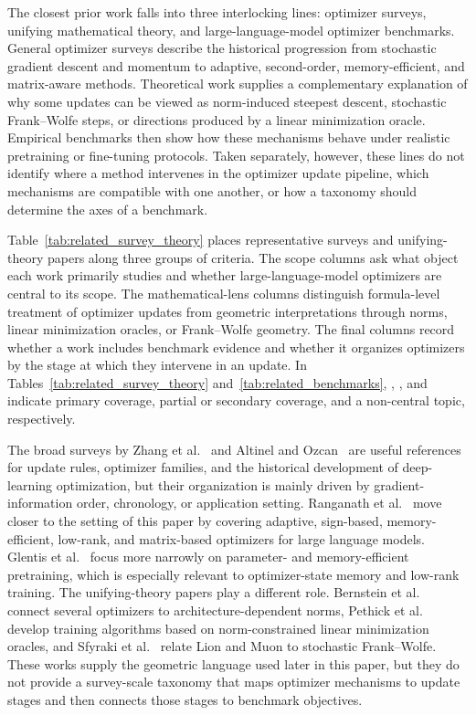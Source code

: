 The closest prior work falls into three interlocking lines: optimizer surveys,
unifying mathematical theory, and large-language-model optimizer benchmarks.
General optimizer surveys describe the historical progression from stochastic
gradient descent and momentum to adaptive, second-order, memory-efficient, and
matrix-aware methods.  Theoretical work supplies a complementary explanation of
why some updates can be viewed as norm-induced steepest descent, stochastic
Frank--Wolfe steps, or directions produced by a linear minimization oracle.
Empirical benchmarks then show how these mechanisms behave under realistic
pretraining or fine-tuning protocols.  Taken separately, however, these lines do
not identify where a method intervenes in the optimizer update pipeline, which
mechanisms are compatible with one another, or how a taxonomy should determine
the axes of a benchmark.

Table~\ref{tab:related_survey_theory} places representative surveys and
unifying-theory papers along three groups of criteria.  The scope columns ask
what object each work primarily studies and whether large-language-model
optimizers are central to its scope.  The mathematical-lens columns distinguish
formula-level treatment of optimizer updates from geometric interpretations
through norms, linear minimization oracles, or Frank--Wolfe geometry.  The final
columns record whether a work includes benchmark evidence and whether it
organizes optimizers by the stage at which they intervene in an update.  In
Tables~\ref{tab:related_survey_theory} and~\ref{tab:related_benchmarks},
\cmark, \pmark, and \xmark indicate primary coverage, partial or secondary
coverage, and a non-central topic, respectively.

The broad surveys by Zhang et al.~\citep{zhang2026evolution} and Altinel and
Ozcan~\citep{altinel2025development} are useful references for update rules,
optimizer families, and the historical development of deep-learning
optimization, but their organization is mainly driven by gradient-information
order, chronology, or application setting.  Ranganath et
al.~\citep{ranganath2026navigating} move closer to the setting of this paper by
covering adaptive, sign-based, memory-efficient, low-rank, and matrix-based
optimizers for large language models.  Glentis et
al.~\citep{glentis2025scalable} focus more narrowly on parameter- and
memory-efficient pretraining, which is especially relevant to optimizer-state
memory and low-rank training.  The unifying-theory papers play a different
role.  Bernstein et al.~\citep{bernstein2024oldoptimizer} connect several
optimizers to architecture-dependent norms, Pethick et
al.~\citep{pethick2025normlmo} develop training algorithms based on
norm-constrained linear minimization oracles, and Sfyraki et
al.~\citep{sfyraki2025lions} relate Lion and Muon to stochastic Frank--Wolfe.
These works supply the geometric language used later in this paper, but they do
not provide a survey-scale taxonomy that maps optimizer mechanisms to update
stages and then connects those stages to benchmark objectives.

